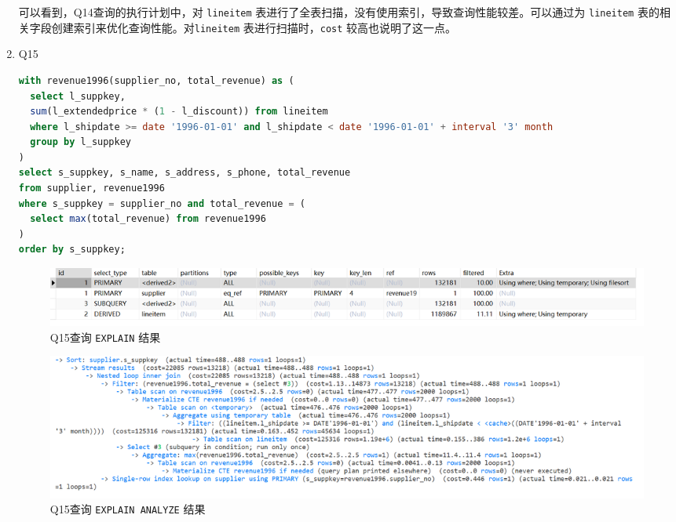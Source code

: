 \documentclass{article}
\renewcommand\tt{\texttt}
\begin{document}
\begin{enumerate}
可以看到，Q14查询的执行计划中，对 \tt{lineitem} 表进行了全表扫描，没有使用索引，导致查询性能较差。可以通过为 \tt{lineitem} 表的相关字段创建索引来优化查询性能。对\tt{lineitem} 表进行扫描时，\tt{cost} 较高也说明了这一点。

\item Q15

\begin{lstlisting}[language=sql]
with revenue1996(supplier_no, total_revenue) as (
  select l_suppkey,
  sum(l_extendedprice * (1 - l_discount)) from lineitem 
  where l_shipdate >= date '1996-01-01' and l_shipdate < date '1996-01-01' + interval '3' month 
  group by l_suppkey
) 
select s_suppkey, s_name, s_address, s_phone, total_revenue 
from supplier, revenue1996 
where s_suppkey = supplier_no and total_revenue = (
  select max(total_revenue) from revenue1996 
) 
order by s_suppkey;
\end{lstlisting}

\begin{figure}[H]
\centering
\includegraphics[width=1\textwidth]{img/29.png}
\caption{Q15查询 \tt{EXPLAIN} 结果}
\end{figure}

\begin{figure}[H]
\centering
\includegraphics[width=1\textwidth]{img/30.png}
\caption{Q15查询 \tt{EXPLAIN ANALYZE} 结果}
\end{figure}


\end{enumerate}
\end{document}

